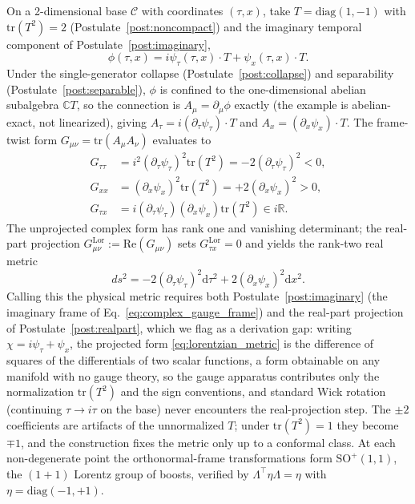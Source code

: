 \documentclass[11pt]{article}
\begin{document}
On a 2-dimensional base $\mathcal{C}$ with coordinates $(\tau, x)$, take $T = \mathrm{diag}(1,-1)$ with $\mathrm{tr}(T^2) = 2$ (Postulate~\ref{post:noncompact}) and the imaginary temporal component of Postulate~\ref{post:imaginary},
\begin{equation}
\phi(\tau, x) = i\psi_\tau(\tau, x) \cdot T + \psi_x(\tau, x) \cdot T.
\label{eq:complex_gauge_frame}
\end{equation}
Under the single-generator collapse (Postulate~\ref{post:collapse}) and separability (Postulate~\ref{post:separable}), $\phi$ is confined to the one-dimensional abelian subalgebra $\mathbb{C}T$, so the connection is $A_\mu = \partial_\mu\phi$ exactly (the example is abelian-exact, not linearized), giving $A_\tau = i(\partial_\tau\psi_\tau)\cdot T$ and $A_x = (\partial_x\psi_x)\cdot T$. The frame-twist form $G_{\mu\nu} = \mathrm{tr}(A_\mu A_\nu)$ evaluates to
\begin{align}
G_{\tau\tau} &= i^2 (\partial_\tau \psi_\tau)^2 \mathrm{tr}(T^2) = -2(\partial_\tau \psi_\tau)^2 < 0, \\
G_{xx} &= (\partial_x \psi_x)^2 \mathrm{tr}(T^2) = +2(\partial_x \psi_x)^2 > 0, \\
G_{\tau x} &= i(\partial_\tau \psi_\tau)(\partial_x \psi_x)\mathrm{tr}(T^2) \in i\mathbb{R}.
\end{align}
The unprojected complex form has rank one and vanishing determinant; the real-part projection $G^{\mathrm{Lor}}_{\mu\nu} := \mathrm{Re}(G_{\mu\nu})$ sets $G^{\mathrm{Lor}}_{\tau x} = 0$ and yields the rank-two real metric
\begin{equation}
\boxed{ds^2 = -2(\partial_\tau \psi_\tau)^2 \mathrm{d}\tau^2 + 2(\partial_x \psi_x)^2 \mathrm{d}x^2.}
\label{eq:lorentzian_metric}
\end{equation}
Calling this the physical metric requires both Postulate~\ref{post:imaginary} (the imaginary frame of Eq.~\eqref{eq:complex_gauge_frame}) and the real-part projection of Postulate~\ref{post:realpart}, which we flag as a derivation gap: writing $\chi = i\psi_\tau + \psi_x$, the projected form \eqref{eq:lorentzian_metric} is the difference of squares of the differentials of two scalar functions, a form obtainable on any manifold with no gauge theory, so the gauge apparatus contributes only the normalization $\mathrm{tr}(T^2)$ and the sign conventions, and standard Wick rotation (continuing $\tau \to i\tau$ on the base) never encounters the real-projection step. The $\pm 2$ coefficients are artifacts of the unnormalized $T$; under $\mathrm{tr}(T^2) = 1$ they become $\mp 1$, and the construction fixes the metric only up to a conformal class. At each non-degenerate point the orthonormal-frame transformations form $\mathrm{SO}^+(1,1)$, the $(1{+}1)$ Lorentz group of boosts, verified by $\Lambda^\top\eta\Lambda = \eta$ with $\eta = \mathrm{diag}(-1,+1)$.
\end{document}
